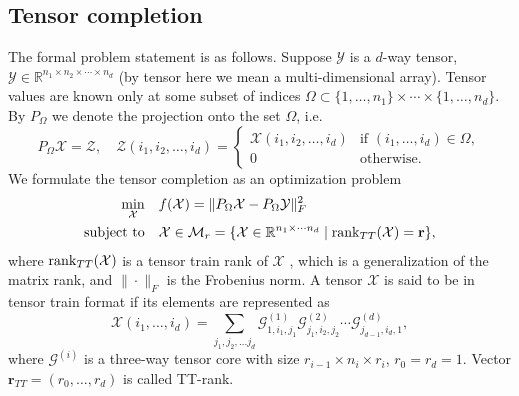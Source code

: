

\subsection{Tensor completion}
\label{sec:tensor_completion}

The formal problem statement is as follows.
Suppose $\mathcal{Y}$ is a $d$-way tensor,
$\mathcal{Y} \in \mathbb{R}^{n_1 \times n_2 \times \cdots \times n_d}$
(by tensor here we mean a multi-dimensional array).
Tensor values are known only at some subset of indices
$\Omega \subset \{1, \ldots, n_1\} \times \cdots \times \{1, \ldots, n_d\}$.
By $P_\Omega$ we denote the projection onto the set $\Omega$, i.e.
\[
P_{\Omega} \mathcal{X} = \mathcal{Z}, \quad
\mathcal{Z}(i_1, i_2, \ldots, i_d) = \begin{cases}
\mathcal{X}(i_1, i_2, \ldots, i_d) & \mbox{if } (i_1, \ldots, i_d) \in \Omega, \\
0 & \mbox{otherwise}.
\end{cases}
\]
We formulate the tensor completion as an optimization problem
\begin{equation}
\begin{aligned}
\label{eq:tensor_completion}
    \min_{\mathcal{X}} \quad &  f(\mathcal{X}) = \|P_{\Omega} \mathcal{X} - P_{\Omega} \mathcal{Y}\|_F^2 \\
    \mbox{subject to} \quad & \mathcal{X} \in \mathcal{M}_r =
    \{\mathcal{X} \in \mathbb{R}^{n_1 \times \cdots n_d} \; | \; {\rm rank}_{TT}
    (\mathcal{X}) = \mathbf{r} \},
\end{aligned}
\end{equation}
where ${\rm rank}_{TT}(\mathcal{X})$ is a tensor train rank of $\mathcal{X}$ \citep{oseledets2011tensor},
which is a generalization of the matrix rank,
and $\|\cdot\|_F$ is the Frobenius norm.
A tensor $\mathcal{X}$ is said to be in tensor train format if its elements are represented as
\[
    \mathcal{X}(i_1, \ldots, i_d) = \sum_{j_1, j_2, \ldots j_d}
    \mathcal{G}^{(1)}_{1, i_1, j_1}
    \mathcal{G}^{(2)}_{j_1, i_2, j_2} \cdots
    \mathcal{G}^{(d)}_{j_{d - 1}, i_d, 1},
\]
where $\mathcal{G}^{(i)}$ is a three-way tensor core with size
$r_{i - 1} \times n_i \times r_{i}$, $r_0 = r_{d} = 1$.
Vector $\mathbf{r}_{TT} = (r_0, \ldots, r_d)$ is called TT-rank.

